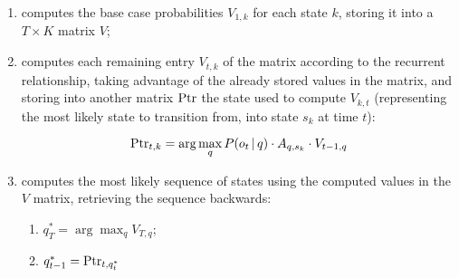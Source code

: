 \begin{enumerate}[label=(\roman*), font=\itshape]
    \item computes the base case probabilities $V_{1, k}$ for each state $k$, storing it into a $T \times K$ matrix $V$;
    
    \item computes each remaining entry $V_{t, k}$ of the matrix according to the recurrent relationship, taking advantage of the already stored values in the matrix, and storing into another matrix $\operatorname{Ptr}$ the state used to compute $V_{k, t}$ (representing the most likely state to transition from, into state $s_k$ at time $t$):
    
    $$\operatorname{Ptr}_{t, k} = \arg \max_{q} P(o_t \, | \, q) \cdot A_{q, s_k} \cdot V_{t-1, q}$$
    
    \item computes the most likely sequence of states using the computed values in the $V$ matrix, retrieving the sequence backwards:
    
    \begin{enumerate}[label=(\alph*), font=\itshape]
        \item $q^*_T = \arg \max_q V_{T, q}$;
        \\
        \item $q^*_{t-1} = \operatorname{Ptr}_{t, q^*_t}$
    \end{enumerate}
\end{enumerate}

